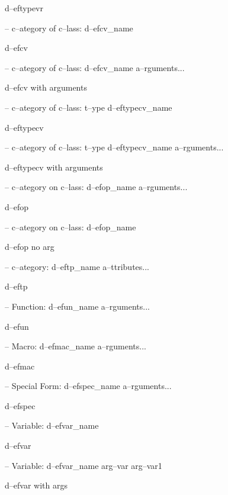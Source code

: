 \documentclass{book}
\begin{document}
\begin{titlepage}
%
d--eftypevr

\hbox{}-- c--ategory of c--lass: d--efcv\_name


%
d--efcv

\hbox{}-- c--ategory of c--lass: d--efcv\_name a--rguments...


%
d--efcv with arguments

\hbox{}-- c--ategory of c--lass: t--ype d--eftypecv\_name


%
d--eftypecv

\hbox{}-- c--ategory of c--lass: t--ype d--eftypecv\_name a--rguments...


%
d--eftypecv with arguments

\hbox{}-- c--ategory on c--lass: d--efop\_name a--rguments...


%
d--efop

\hbox{}-- c--ategory on c--lass: d--efop\_name


%
d--efop no arg

\hbox{}-- c--ategory: d--eftp\_name a--ttributes...


%
d--eftp

\hbox{}-- Function: d--efun\_name a--rguments...


%
d--efun

\hbox{}-- Macro: d--efmac\_name a--rguments...


%
d--efmac

\hbox{}-- Special Form: d--efspec\_name a--rguments...


%
d--efspec

\hbox{}-- Variable: d--efvar\_name


%
d--efvar

\hbox{}-- Variable: d--efvar\_name arg--var arg--var1


%
d--efvar with args


\end{titlepage}
\end{document}
